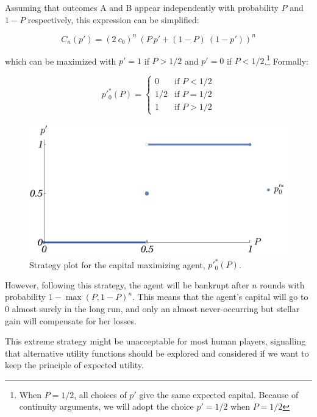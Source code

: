 \documentclass{article}
\theoremstyle{definition}
\begin{document}
Assuming that outcomes A and B appear independently with probability $P$ and $1-P$ respectively, this expression can be simplified:

\begin{equation}
    C_n(p') = (2 \ c_0)^n \ \left ( P \ p' + (1-P) \ (1-p') \right )^n
\end{equation}

which can be maximized with $p' = 1$ if $P>1/2$ and $p' = 0$ if $P<1/2$.\footnote{When $P=1/2$, all choices of $p'$ give the same expected capital. Because of continuity arguments, we will adopt the choice $p'=1/2$ when $P=1/2$} Formally:

\begin{equation}
    p'^*_0(P) =
    \begin{cases}
        0 & \text{if } P < 1/2 \\
        1/2 & \text{if } P = 1/2 \\
        1 & \text{if } P > 1/2 
    \end{cases}
\end{equation}

\begin{figure}[H]
    \centering
    \includegraphics[width=12 cm]{img/pp_0_P.pdf}
    \caption{Strategy plot for the capital maximizing agent, $p'^*_0(P)$.}
    \label{fig:PolicyPlot_CapitalMax}
\end{figure}

However, following this strategy, the agent will be bankrupt after $n$ rounds with probability $1-\max(P,1-P)^n$. This means that the agent's capital will go to $0$ almost surely in the long run, and only an almost never-occurring but stellar gain will compensate for her losses.

This extreme strategy might be unacceptable for most human players, signalling that alternative utility functions should be explored and considered if we want to keep the principle of expected utility.
\end{document}
